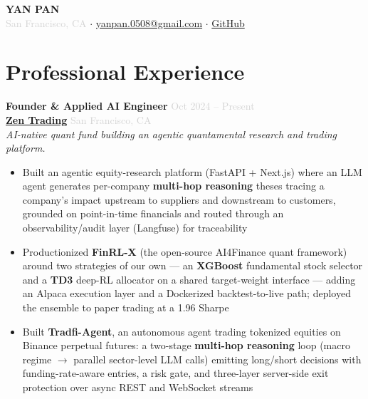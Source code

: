 \documentclass[11pt,a4paper]{article}
\newcommand{\resumeItem}[1]{\item #1}
\newcommand{\daterange}[1]{\hfill \textcolor{lightgray}{\small #1}}
\newcommand{\location}[1]{\hfill \textcolor{lightgray}{\small #1}}
\begin{document}
\begin{center}
    {\LARGE\bfseries YAN PAN}\\[6pt]
    \textcolor{lightgray}{San Francisco, CA} \quad $\cdot$ \quad 
    \href{mailto:yanpan.0508@gmail.com}{yanpan.0508@gmail.com} \quad $\cdot$ \quad
    \href{https://github.com/Yvette-0508}{GitHub}
\end{center}

\vspace{-8pt}

\section{Professional Experience}

\textbf{Founder \& Applied AI Engineer} \daterange{Oct 2024 -- Present}\\
\href{https://zentradings.com/}{\textbf{Zen Trading}} \location{San Francisco, CA}\\
\textit{AI-native quant fund building an agentic quantamental research and trading platform.}
\begin{itemize}[leftmargin=*, nosep, itemsep=2pt]
    \resumeItem{Built an agentic equity-research platform (FastAPI + Next.js) where an LLM agent generates per-company \textbf{multi-hop reasoning} theses tracing a company's impact upstream to suppliers and downstream to customers, grounded on point-in-time financials and routed through an observability/audit layer (Langfuse) for traceability}
    \resumeItem{Productionized \textbf{FinRL-X} (the open-source AI4Finance quant framework) around two strategies of our own --- an \textbf{XGBoost} fundamental stock selector and a \textbf{TD3} deep-RL allocator on a shared target-weight interface --- adding an Alpaca execution layer and a Dockerized backtest-to-live path; deployed the ensemble to paper trading at a 1.96 Sharpe}
    \resumeItem{Built \textbf{Tradfi-Agent}, an autonomous agent trading tokenized equities on Binance perpetual futures: a two-stage \textbf{multi-hop reasoning} loop (macro regime $\rightarrow$ parallel sector-level LLM calls) emitting long/short decisions with funding-rate-aware entries, a risk gate, and three-layer server-side exit protection over async REST and WebSocket streams}
\end{itemize}

\vspace{6pt}
\end{document}
